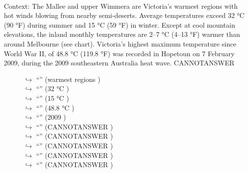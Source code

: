 \documentclass[11pt,a4paper, onecolumn]{article}
\begin{document}
\\ Context: The Mallee and upper Wimmera are Victoria's warmest regions with hot winds blowing from nearby semi-deserts. Average temperatures exceed 32 °C (90 °F) during summer and 15 °C (59 °F) in winter. Except at cool mountain elevations, the inland monthly temperatures are 2–7 °C (4–13 °F) warmer than around Melbourne (see chart). Victoria's highest maximum temperature since World War II, of 48.8 °C (119.8 °F) was recorded in Hopetoun on 7 February 2009, during the 2009 southeastern Australia heat wave. CANNOTANSWER

\begin{figure}[t] \small \begin{tcolorbox}[boxsep=0pt,left=5pt,right=0pt,top=2pt,colback = yellow!5] \begin{dialogue}
 \small 
\colorbox{pink!25}{$\hookrightarrow$}
{ ``'' (warmest regions ) }
\\
\colorbox{pink!25}{$\hookrightarrow$}
{ ``'' (32 °C ) }
\\
\colorbox{pink!25}{$\hookrightarrow$}
{ ``'' (15 °C ) }
\\
\colorbox{pink!25}{$\hookrightarrow$}
{ ``'' (48.8 °C ) }
\\
\colorbox{pink!25}{$\hookrightarrow$}
{ ``'' (2009 ) }
\\
\colorbox{pink!25}{$\hookrightarrow$}
{ ``'' (CANNOTANSWER ) }
\\
\colorbox{pink!25}{$\hookrightarrow$}
{ ``'' (CANNOTANSWER ) }
\\
\colorbox{pink!25}{$\hookrightarrow$}
{ ``'' (CANNOTANSWER ) }
\\
\colorbox{pink!25}{$\hookrightarrow$}
{ ``'' (CANNOTANSWER ) }
\\
\colorbox{pink!25}{$\hookrightarrow$}
{ ``'' (CANNOTANSWER ) }
\\
 \end{dialogue}\end{tcolorbox}\end{figure}
\end{document}
